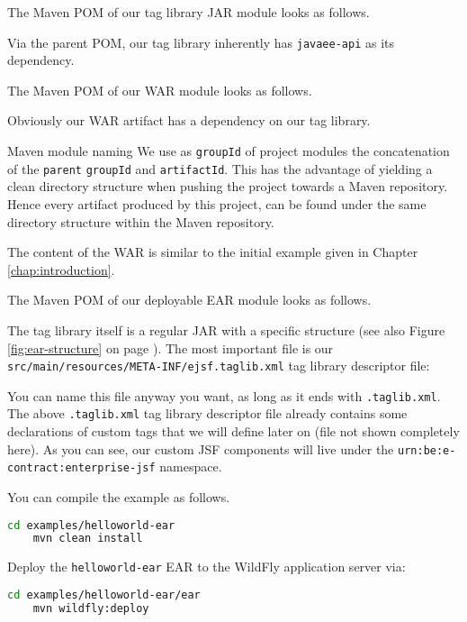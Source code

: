 The Maven POM of our tag library JAR module looks as follows.

Via the parent POM, our tag library inherently has \texttt{javaee-api} as its dependency.

The Maven POM of our WAR module looks as follows.

Obviously our WAR artifact has a dependency on our tag library.
\begin{TIP}{Maven module naming}
	We use as \texttt{groupId} of project modules the concatenation	of the \texttt{parent} \texttt{groupId} and \texttt{artifactId}.
	This has the advantage of yielding a clean directory structure when pushing the project towards a Maven repository.
	Hence every artifact produced by this project, can be found under the same directory structure within the Maven repository.
\end{TIP}

The content of the WAR is similar to the initial example given in Chapter \ref{chap:introduction}.

The Maven POM of our deployable EAR module looks as follows.


The tag library itself is a regular JAR with a specific structure (see also Figure \ref{fig:ear-structure} on page \pageref{fig:ear-structure}).
The most important file is our\\
\texttt{src/main/resources/META-INF/ejsf.taglib.xml} tag library descriptor file:

You can name this file anyway you want, as long as it ends with \texttt{.taglib.xml}.
The above \texttt{.taglib.xml} tag library descriptor file already contains some declarations of custom tags that we will define later on (file not shown completely here).
As you can see, our custom JSF components will live under the \texttt{urn:be:e-contract:enterprise-jsf} namespace.

You can compile the example as follows.
\begin{lstlisting}[language=bash]
	cd examples/helloworld-ear
	mvn clean install
\end{lstlisting}

Deploy the \texttt{helloworld-ear} EAR to the WildFly application server via:
\begin{lstlisting}[language=bash]
	cd examples/helloworld-ear/ear
	mvn wildfly:deploy
\end{lstlisting}

